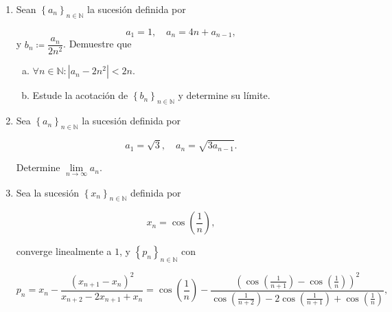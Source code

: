 \documentclass[
	spanish,
	8pt,
	utf8,
	xcolor=table,
	handout,
	aspectratio=169,
	professionalfonts,
	notheorems,
	mathserif,
]{beamer}
\newcounter{savedenum}
\newcommand*{\resume}{\setcounter{enumi}{\thesavedenum}}
\begin{document}
\begin{frame}
	\begin{enumerate}
		\resume

		\item
		      Sean $\left\{a_{n}\right\}_{n\in\mathbb{N}}$ la sucesión
		      definida por

		      \begin{equation*}
			      a_{1}=1,\quad
			      a_{n}=4n+a_{n-1},
		      \end{equation*}
		      y $b_{n}\coloneqq\dfrac{a_{n}}{2n^{2}}$.
		      Demuestre que

		      \begin{multicols}{2}

			      \begin{enumerate}[a)]
				      \item

				            $\forall n\in\mathbb{N}:\left|a_{n}-2n^{2}\right|<2n$.

				      \item

				            Estude la acotación de
				            $\left\{b_{n}\right\}_{n\in\mathbb{N}}$ y
				            determine su límite.
			      \end{enumerate}
		      \end{multicols}

		\item
		      Sea $\left\{a_{n}\right\}_{n\in\mathbb{N}}$ la sucesión
		      definida por

		      \begin{equation*}
			      a_{1}=\sqrt{3},\quad
			      a_{n}=\sqrt{3a_{n-1}}.
		      \end{equation*}

		      Determine $\lim\limits_{n\to\infty}a_{n}$.

		\item
		      Sea la sucesión $\left\{x_{n}\right\}_{n\in\mathbb{N}}$
		      definida por

		      \begin{equation*}
			      x_{n}=\cos\left(\frac{1}{n}\right),
		      \end{equation*}

		      converge linealmente a $1$, y
		      $\left\{p_{n}\right\}_{n\in\mathbb{N}}$ con

		      \begin{equation*}
			      p_{n}=
			      x_{n}-
			      \frac{
			      {\left(x_{n+1}-x_{n}\right)}^{2}}{
			      x_{n+2}-2x_{n+1}+x_{n}
			      }=
			      \cos\left(\frac{1}{n}\right)-
			      \frac{
				      {\left(
						      \cos\left(\frac{1}{n+1}\right)-
						      \cos\left(\frac{1}{n}\right)
						      \right)}^{2}
			      }{
				      \cos\left(\frac{1}{n+2}\right)-
				      2\cos\left(\frac{1}{n+1}\right)+
				      \cos\left(\frac{1}{n}\right)
			      },
		      \end{equation*}


\end{enumerate}
\end{frame}
\end{document}
